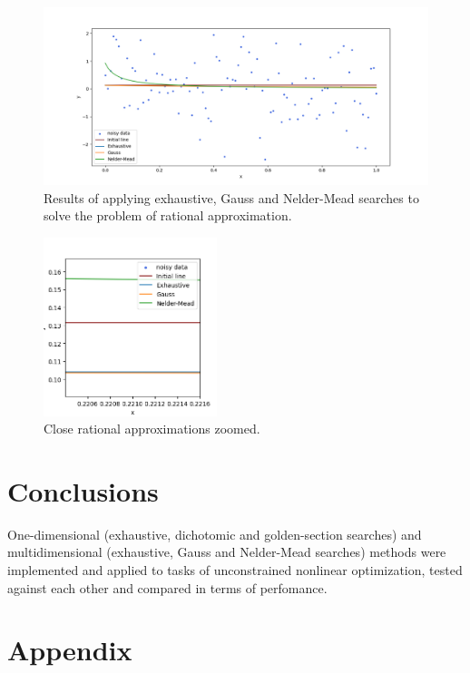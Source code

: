 \documentclass[12pt, a4paper]{article}
\begin{document}
\begin{figure}[!h]
\centering
\includegraphics[width=\textwidth]{rational1.png}
\caption{Results of applying exhaustive, Gauss and Nelder-Mead searches to solve the problem of rational approximation.}
\end{figure}

\begin{figure}[!h]
\centering
\includegraphics[width=0.45\textwidth]{rational2.png}
\caption{Close rational approximations zoomed.}
\end{figure}

\section*{Conclusions}

One-dimensional (exhaustive, dichotomic and golden-section searches) and multidimensional (exhaustive, Gauss and Nelder-Mead searches) methods were implemented and applied to tasks of unconstrained nonlinear optimization, tested against each other and compared in terms of perfomance.

\newpage

\section*{Appendix}
\end{document}
